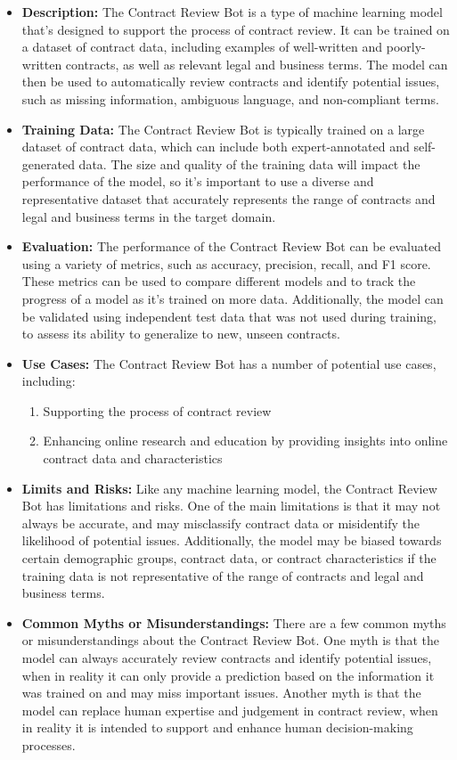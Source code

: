 \begin{itemize}
    \item \textbf{Description:} The Contract Review Bot is a type of machine learning model that's designed to support the process of contract review. It can be trained on a dataset of contract data, including examples of well-written and poorly-written contracts, as well as relevant legal and business terms. The model can then be used to automatically review contracts and identify potential issues, such as missing information, ambiguous language, and non-compliant terms.
    \item \textbf{Training Data:} The Contract Review Bot is typically trained on a large dataset of contract data, which can include both expert-annotated and self-generated data. The size and quality of the training data will impact the performance of the model, so it's important to use a diverse and representative dataset that accurately represents the range of contracts and legal and business terms in the target domain.
    \item \textbf{Evaluation:} The performance of the Contract Review Bot can be evaluated using a variety of metrics, such as accuracy, precision, recall, and F1 score. These metrics can be used to compare different models and to track the progress of a model as it's trained on more data. Additionally, the model can be validated using independent test data that was not used during training, to assess its ability to generalize to new, unseen contracts.
    \item \textbf{Use Cases:} The Contract Review Bot has a number of potential use cases, including:
        \begin{enumerate}  
            \item Supporting the process of contract review
            \item Enhancing online research and education by providing insights into online contract data and characteristics
        \end{enumerate}
    \item \textbf{Limits and Risks:} Like any machine learning model, the Contract Review Bot has limitations and risks. One of the main limitations is that it may not always be accurate, and may misclassify contract data or misidentify the likelihood of potential issues. Additionally, the model may be biased towards certain demographic groups, contract data, or contract characteristics if the training data is not representative of the range of contracts and legal and business terms.
    \item \textbf{Common Myths or Misunderstandings:} There are a few common myths or misunderstandings about the Contract Review Bot. One myth is that the model can always accurately review contracts and identify potential issues, when in reality it can only provide a prediction based on the information it was trained on and may miss important issues. Another myth is that the model can replace human expertise and judgement in contract review, when in reality it is intended to support and enhance human decision-making processes.
\end{itemize}

